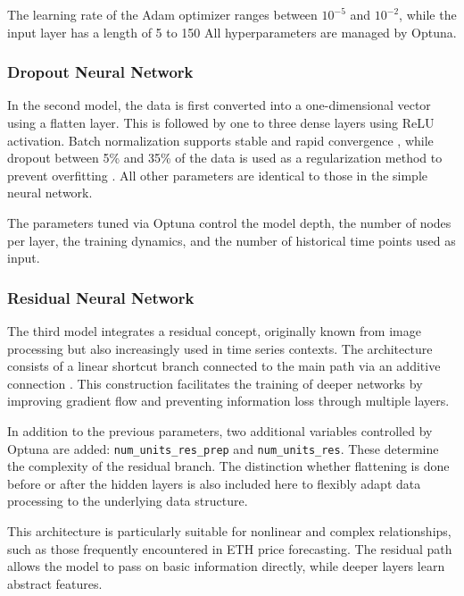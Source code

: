 The learning rate of the Adam optimizer ranges between $10^{-5}$ and $10^{-2}$, while the input layer has a length of 5 to 150
All hyperparameters are managed by Optuna.



\subsubsection{Dropout Neural Network}

In the second model, the data is first converted into a one-dimensional vector using a flatten layer.
This is followed by one to three dense layers using ReLU activation.
Batch normalization supports stable and rapid convergence \cite{batch-normalization}, while dropout between 5\% and 35\% of the data is used as a regularization method to prevent overfitting \cite{keras-dropout}.
All other parameters are identical to those in the simple neural network.

The parameters tuned via Optuna control the model depth, the number of nodes per layer, the training dynamics, and the number of historical time points used as input.



\subsubsection{Residual Neural Network}

The third model integrates a residual concept, originally known from image processing but also increasingly used in time series contexts.
The architecture consists of a linear shortcut branch connected to the main path via an additive connection \cite{residual-nn}.
This construction facilitates the training of deeper networks by improving gradient flow and preventing information loss through multiple layers.

In addition to the previous parameters, two additional variables controlled by Optuna are added: \verb|num_units_res_prep| and \verb|num_units_res|.
These determine the complexity of the residual branch.
The distinction whether flattening is done before or after the hidden layers is also included here to flexibly adapt data processing to the underlying data structure.

This architecture is particularly suitable for nonlinear and complex relationships, such as those frequently encountered in ETH price forecasting.
The residual path allows the model to pass on basic information directly, while deeper layers learn abstract features.

